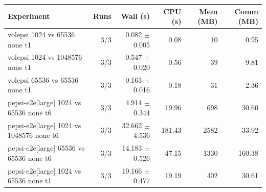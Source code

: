 \begin{tabular}{lrrrrr}
\toprule
Experiment & Runs & Wall (s) & CPU (s) & Mem (MB) & Comm (MB) \\
\midrule
volepsi 1024 vs 65536 none t1 & 3/3 & 0.082 $\pm$ 0.005 & 0.08 & 10 & 0.95 \\
volepsi 1024 vs 1048576 none t1 & 3/3 & 0.547 $\pm$ 0.020 & 0.56 & 39 & 9.81 \\
volepsi 65536 vs 65536 none t1 & 3/3 & 0.163 $\pm$ 0.016 & 0.18 & 31 & 2.36 \\
pepsi-e2e[large] 1024 vs 65536 none t6 & 3/3 & 4.914 $\pm$ 0.344 & 19.96 & 698 & 30.60 \\
pepsi-e2e[large] 1024 vs 1048576 none t6 & 3/3 & 32.662 $\pm$ 4.536 & 181.43 & 2582 & 33.92 \\
pepsi-e2e[large] 65536 vs 65536 none t6 & 3/3 & 14.183 $\pm$ 0.526 & 47.15 & 1330 & 160.38 \\
pepsi-e2e[large] 1024 vs 65536 none t1 & 3/3 & 19.166 $\pm$ 0.477 & 19.19 & 402 & 30.61 \\
\bottomrule
\end{tabular}
